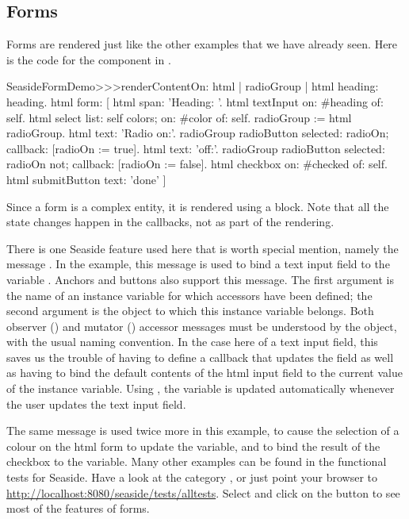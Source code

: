 \documentclass[a4paper,10pt,twoside]{book}
\begin{document}
\subsection{Forms}

Forms are rendered just like the other examples that we have already seen.
Here is the code for the  component in .

\begin{code}{}
SeasideFormDemo>>>renderContentOn: html
	| radioGroup |
	html heading: heading.
	html form: [
		html span: 'Heading: '.
		html textInput on: #heading of: self.
		html select
			list: self colors;
			on: #color of: self.
		radioGroup := html radioGroup.
		html text: 'Radio on:'.
		radioGroup radioButton
			selected: radioOn;
			callback: [radioOn := true].
		html text: 'off:'.
		radioGroup radioButton
			selected: radioOn not;
			callback: [radioOn := false].
		html checkbox on: #checked of: self.
		html submitButton
			text: 'done' ]
\end{code}{}

Since a form is a complex entity, it is rendered using a block.
Note that all the state changes happen in the callbacks, not as part of the rendering.

There is one Seaside feature used here that is worth special mention, namely the message
.
In the example, this message is used to bind a text input field to the variable
.
Anchors and buttons also support this message.
The first argument is the name of an instance variable for which accessors have been
defined; the second argument is the object to which this instance variable belongs.
Both observer () and mutator () accessor messages must be
understood by the object, with the usual naming convention.
In the case here of a text input field, this saves us the trouble of having to define a
callback that updates the field as well as having to bind the default contents of the
html input field to the current value of the instance variable.
Using , the  variable is updated automatically
whenever the user updates the text input field.

The same message is used twice more in this example, to cause the selection of a colour
on the html form to update the  variable, and to bind the result of the
checkbox to the  variable.
Many other examples can be found in the functional tests for Seaside.
Have a look at the category , or just point your browser
to \url{http://localhost:8080/seaside/tests/alltests}.
Select  and click on the  button to see most of the
features of forms.
\end{document}
